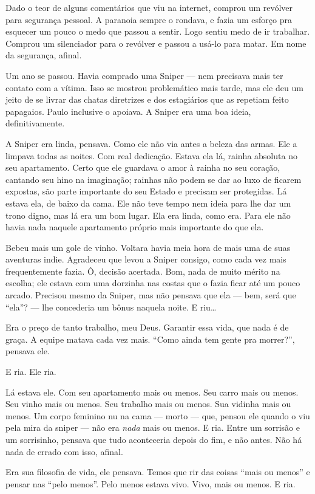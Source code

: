 Dado o teor de alguns comentários que viu na internet, comprou um revólver para segurança pessoal. A paranoia sempre o rondava, e fazia um esforço pra esquecer um pouco o medo que passou a sentir. Logo sentiu medo de ir trabalhar. Comprou um silenciador para o revólver e passou a usá-lo para matar. Em nome da segurança, afinal.

Um ano se passou. Havia comprado uma Sniper --- nem precisava mais ter contato com a vítima. Isso se mostrou pro\-ble\-má\-ti\-co mais tarde, mas ele deu um jeito de se livrar das chatas diretrizes e dos estagiários que as repetiam feito papagaios. Paulo inclusive o apoiava. A Sniper era uma boa ideia, definitivamente.

A Sniper era linda, pensava. Como ele não via antes a beleza das armas. Ele a limpava todas as noites. Com real dedicação. Estava ela lá, rainha absoluta no seu apartamento. Certo que ele guardava o amor à rainha no seu coração, cantando seu hino na imaginação; rainhas não podem se dar ao luxo de ficarem expostas, são parte importante do seu Estado e precisam ser protegidas. Lá estava ela, de baixo da cama. Ele não teve tempo nem ideia para lhe dar um trono digno, mas lá era um bom lugar. Ela era linda, como era. Para ele não havia nada naquele apartamento próprio mais importante do que ela.

Bebeu mais um gole de vinho. Voltara havia meia hora de mais uma de suas aventuras indie. Agradeceu que levou a Sniper consigo, como cada vez mais frequentemente fazia. Ô, decisão acertada. Bom, nada de muito mérito na escolha; ele estava com uma dorzinha nas costas que o fazia ficar até um pouco arcado. Precisou mesmo da Sniper, mas não pensava que ela --- bem, será que ``ela''? --- lhe concederia um bônus naquela noite. E riu\ldots

Era o preço de tanto trabalho, meu Deus. Garantir essa vida, que nada é de graça. A equipe matava cada vez mais. ``Como ainda tem gente pra morrer?'', pensava ele.

E ria. Ele ria.

Lá estava ele. Com seu apartamento mais ou menos. Seu carro mais ou menos. Seu vinho mais ou menos. Seu trabalho mais ou menos. Sua vidinha mais ou menos. Um corpo feminino nu na cama --- morto --- que, pensou ele quando o viu pela mira da sniper --- não era \emph{nada} mais ou menos. E ria. Entre um sorrisão e um sorrisinho, pensava que tudo aconteceria depois do fim, e não antes. Não há nada de errado com isso, afinal.

Era sua filosofia de vida, ele pensava. Temos que rir das coisas ``mais ou menos'' e pensar nas ``pelo menos''. Pelo menos estava vivo. Vivo, mais ou menos. E ria.
